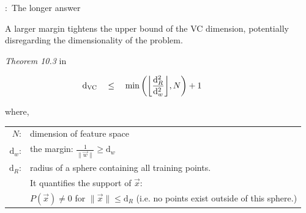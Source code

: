 \begin{frame}{\subsecname:~The longer answer}


A larger margin tightens the upper bound of the VC dimension, potentially disregarding the dimensionality of the problem. 

\begin{block}{\textit{Theorem 10.3} in \citep{Vapnik1998}}

\begin{equation}
    \mathrm{d}_{\mathrm{VC}} \quad\leq\quad \min \bigg( \bigg\lfloor 
    \frac{\mathrm{d}_R^2}{\mathrm{d}_{{w}}^2}
\bigg\rfloor, N \bigg) + 1\qquad\qquad
\label{eq:dvcmarginbound}
\end{equation}

where,\\

\begin{tabular}{rl}
    $N$\;:& dimension of feature space \\[1mm]
    $\mathrm{d}_w$\;:& the margin: 
        $\frac{1}{\|\vec w \|} \geq \mathrm{d}_w$ \\[1mm]
    $\mathrm{d}_R$\;:& radius of a sphere containing all training points.\\
    &It quantifies the support of $\vec x$:\\
    & $P(\vec x) \neq 0$ for $\|\vec x\| \leq \mathrm{d}_R$ (i.e. no points exist outside of this sphere.)
\end{tabular}
\end{block}


\end{frame}
